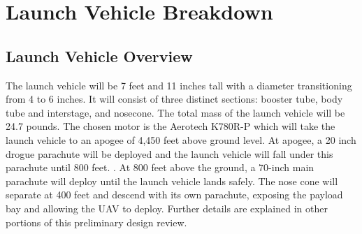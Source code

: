\chapter{Launch Vehicle Breakdown}

\section{Launch Vehicle Overview}
The launch vehicle will be 7 feet and 11 inches tall with a diameter transitioning from 4 to 6 inches. It will consist of three distinct sections: booster tube, body tube and interstage, and nosecone. The total mass of the launch vehicle will be 24.7 pounds. The chosen motor is the Aerotech K780R-P which will take the launch vehicle to an apogee of 4,450 feet above ground level. At apogee, a 20 inch drogue parachute will be deployed and the launch vehicle will fall under this parachute until 800 feet. . At 800 feet above the ground, a 70-inch main parachute will deploy until the launch vehicle lands safely. The nose cone will separate at 400 feet and descend with its own parachute, exposing the payload bay and allowing the UAV to deploy. Further details are explained in other portions of this preliminary design review.

